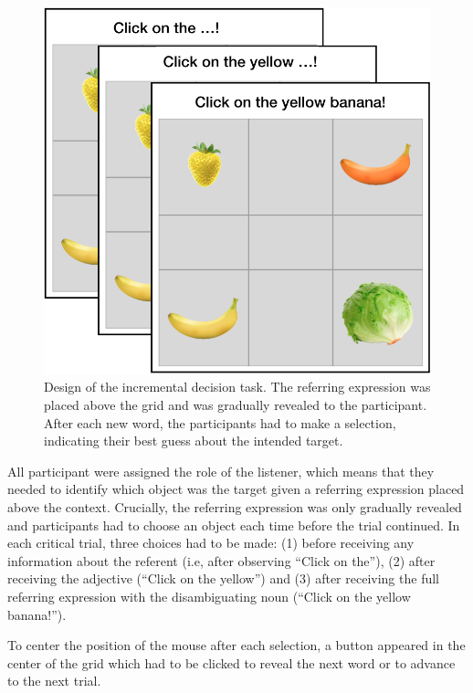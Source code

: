 \documentclass[10pt,letterpaper]{article}
\begin{document}
\begin{figure}
	\begin{center}
		\includegraphics[width=.35\textwidth]{graphs/IDT-design.pdf}
	\end{center}
\caption{Design of the incremental decision task. The referring expression was placed above the grid and was gradually revealed to the participant. After each new word, the participants had to make a selection, indicating their best guess about the intended target.} 
\label{prod-results}
\end{figure}

All participant were assigned the role of the listener, which means that they needed to identify which object was the target given a referring expression placed above the context. Crucially, the referring expression was only gradually revealed and participants had to choose an object each time before the trial continued. In each critical trial, three choices had to be made: (1) before receiving any information about the referent (i.e, after observing ``Click on the''), (2) after receiving the adjective (``Click on the yellow'') and (3) after receiving the full referring expression with the disambiguating noun (``Click on the yellow banana!''). 

To center the position of the mouse after each selection, a button appeared in the center of the grid which had to be clicked to reveal the next word or to advance to the next trial. 
\end{document}
